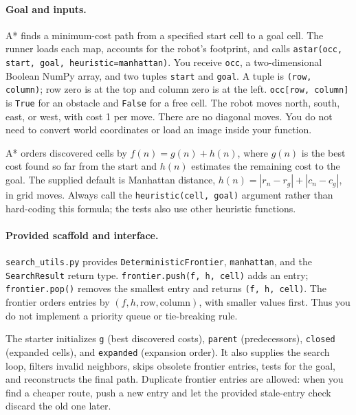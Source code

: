 \documentclass[11pt]{article}
\begin{document}
\paragraph{Goal and inputs.}
A* finds a minimum-cost path from a specified start cell to a goal cell.
The runner loads each map, accounts for the robot's footprint, and calls
\texttt{astar(occ, start, goal, heuristic=manhattan)}. You receive
\texttt{occ}, a two-dimensional Boolean NumPy array, and two tuples
\texttt{start} and \texttt{goal}. A tuple is \texttt{(row, column)};
row zero is at the top and column zero is at the left.
\texttt{occ[row, column]} is \texttt{True} for an obstacle and
\texttt{False} for a free cell. The robot moves north, south, east, or
west, with cost 1 per move. There are no diagonal moves. You do not need
to convert world coordinates or load an image inside your function.

A* orders discovered cells by $f(n)=g(n)+h(n)$, where $g(n)$ is the
best cost found so far from the start and $h(n)$ estimates the remaining
cost to the goal. The supplied default is Manhattan distance,
$h(n)=|r_n-r_g|+|c_n-c_g|$, in grid moves. Always call the
\texttt{heuristic(cell, goal)} argument rather than hard-coding this
formula; the tests also use other heuristic functions.

\paragraph{Provided scaffold and interface.}
\texttt{search\_utils.py} provides \texttt{DeterministicFrontier},
\texttt{manhattan}, and the \texttt{SearchResult} return type.
\texttt{frontier.push(f, h, cell)} adds an entry;
\texttt{frontier.pop()} removes the smallest entry and returns
\texttt{(f, h, cell)}. The frontier orders entries by
$(f,h,\text{row},\text{column})$, with smaller values first.
Thus you do not implement a priority queue or tie-breaking rule.

The starter initializes \texttt{g} (best discovered costs),
\texttt{parent} (predecessors), \texttt{closed} (expanded cells), and
\texttt{expanded} (expansion order). It also supplies the search loop,
filters invalid neighbors, skips obsolete frontier entries, tests for
the goal, and reconstructs the final path. Duplicate frontier entries
are allowed: when you find a cheaper route, push a new entry and let the
provided stale-entry check discard the old one later.
\end{document}
